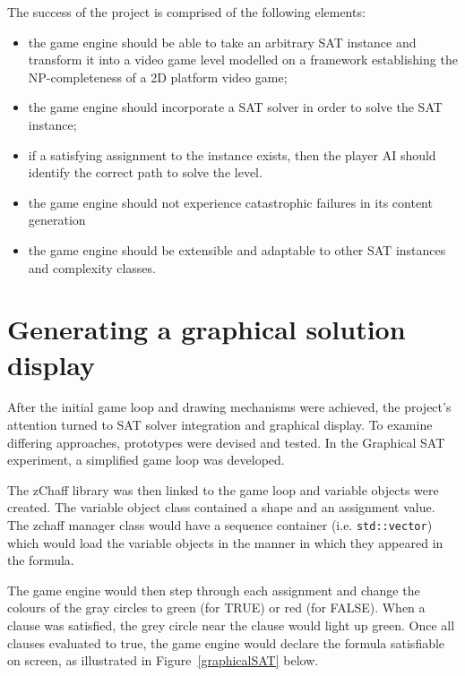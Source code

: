 \documentclass[11pt, a4paper, oneside]{report} %
\begin{document}
The success of the project is comprised of the following elements:

\begin{itemize}
\item the game engine should be able to take an arbitrary SAT instance and 
transform it into a video game level modelled on a framework establishing the 
NP-completeness of a 2D platform video game;
\item the game engine should incorporate a SAT solver in order to solve the SAT instance;
\item if a satisfying assignment to the instance exists, then the player AI should
identify the correct path to solve the level. 
\item the game engine should not experience catastrophic failures in its content generation
\item the game engine should be extensible and adaptable to other SAT instances and complexity classes.
\end{itemize}


\section{Generating a graphical solution display}

After the initial game loop and drawing mechanisms were achieved, the project's
attention turned to SAT solver integration and graphical display. To examine
differing approaches, prototypes were devised and tested. In the Graphical SAT
experiment, a simplified game loop was developed. 

The zChaff library was then linked to the game loop and variable objects were
created. The variable object class contained a shape and an assignment value.
The zchaff manager class would have a sequence container (i.e.
\texttt{std::vector}) which would load the variable objects in the manner in
which they appeared in the formula. 

The game engine would then step through each assignment and change the colours
of the gray circles to green (for TRUE) or red (for FALSE). When a clause was
satisfied, the grey circle near the clause would light up green. Once all
clauses evaluated to true, the game engine would declare the formula satisfiable
on screen, as illustrated in Figure~\ref{graphicalSAT} below.
\end{document}
